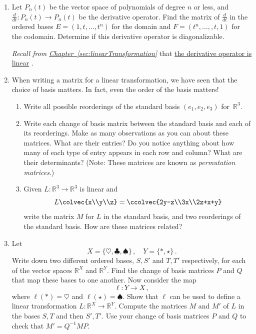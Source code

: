 


\begin{enumerate}
\item Let $P_n(t)$ be the vector space of polynomials of degree $n$ or less, and $\frac{d}{dt} \colon P_n(t) \to P_{n}(t)$ be the derivative operator.  Find the matrix of $\frac{d}{dt}$ in the ordered bases $E=(1,t,\ldots,t^n )$ for the domain and $F=(t^{n}, \ldots, ,t,1 )$ for the codomain. Determine if this derivative operator is diagonalizable. 

\emph{Recall from 
\hyperref[sec:linearTransformation]{Chapter~\ref*{sec:linearTransformation}}} 
that \hyperlink{derivative_linear}{the derivative operator is linear} .


\item When writing a matrix for a linear transformation, we have seen that the choice of basis matters.  In fact, even the order of the basis matters!
\begin{enumerate}
\item Write all possible reorderings of the standard basis $(e_1,e_2,e_3)$ for~$\mathbb{R}^3$.
\item Write each change of basis matrix between the standard basis and each of its reorderings.  Make as many observations as you can about these matrices. What are their entries? Do you notice anything about how many of each type of entry appears in each row and column? What are their determinants?  (Note: These matrices are known as \emph{permutation matrices}.)
\item Given $L:\mathbb{R}^3\to \mathbb{R}^3$ is linear and  
\[
L\colvec{x\\y\\z}=\ccolvec{2y-z\\3x\\2z+x+y}
\] 
write the matrix $M$ for $L$ in the standard basis, and two reorderings of the standard basis.  How are these matrices related?
\end{enumerate}


\item Let \[X=\{\heartsuit,\clubsuit,\spadesuit\}\, ,\quad Y=\{*,\star\}\, .\] Write down two different ordered bases, $S,S'$ and $T,T'$ respectively, for each of the vector spaces ${\mathbb R}^X$ and ${\mathbb R}^Y$. Find the change of basis matrices $P$ and $Q$ that map these bases to one another. Now consider the map
\[
\ell:Y\to X\, ,
\]
where $\ell(*)=\heartsuit$ and $\ell(\star)=\spadesuit$. Show that $\ell$ can be used to define a linear transformation $L:{\mathbb R}^X\to{\mathbb R}^Y$. Compute the matrices $M$ and $M'$ of $L$ in the bases $S,T$ and then $S',T'$. Use your change of basis matrices $P$ and $Q$ to 
check that $M'=Q^{-1}MP$.


\end{enumerate}
